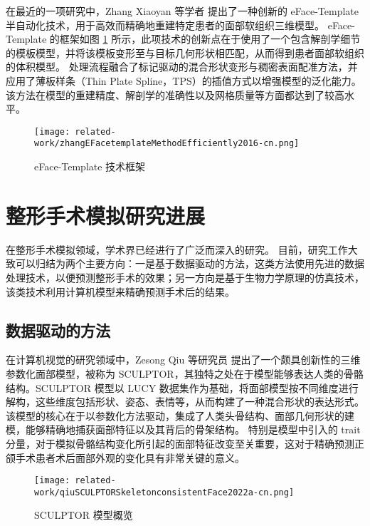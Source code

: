 在最近的一项研究中，Zhang Xiaoyan 等学者 \cite{zhangEFacetemplateMethodEfficiently2016} 提出了一种创新的 eFace-Template 半自动化技术，用于高效而精确地重建特定患者的面部软组织三维模型。
eFace-Template 的框架如图 \ref{fig:zhangEFacetemplateMethodEfficiently2016} 所示，此项技术的创新点在于使用了一个包含解剖学细节的模板模型，并将该模板变形至与目标几何形状相匹配，从而得到患者面部软组织的体积模型。
处理流程融合了标记驱动的混合形状变形与稠密表面配准方法，并应用了薄板样条（Thin Plate Spline，TPS）的插值方式以增强模型的泛化能力。
该方法在模型的重建精度、解剖学的准确性以及网格质量等方面都达到了较高水平。

\begin{figure}
  \centering
  \texttt{[image: related-work/zhangEFacetemplateMethodEfficiently2016-cn.png]}
  \caption{eFace-Template 技术框架 \cite{zhangEFacetemplateMethodEfficiently2016}}
  \label{fig:zhangEFacetemplateMethodEfficiently2016}
\end{figure}

\section{整形手术模拟研究进展}

在整形手术模拟领域，学术界已经进行了广泛而深入的研究。
目前，研究工作大致可以归结为两个主要方向：一是基于数据驱动的方法，这类方法使用先进的数据处理技术，以便预测整形手术的效果；另一方向是基于生物力学原理的仿真技术，该类技术利用计算机模型来精确预测手术后的结果。

\subsection{数据驱动的方法}

在计算机视觉的研究领域中，Zesong Qiu 等研究员 \cite{qiuSCULPTORSkeletonconsistentFace2022a} 提出了一个颇具创新性的三维参数化面部模型，被称为 SCULPTOR，其独特之处在于模型能够表达人类的骨骼结构。SCULPTOR 模型以 LUCY 数据集作为基础，将面部模型按不同维度进行解构，这些维度包括形状、姿态、表情等，从而构建了一种混合形状的表达形式。
该模型的核心在于以参数化方法驱动，集成了人类头骨结构、面部几何形状的建模，能够精确地捕获面部特征以及其背后的骨架结构。
特别是模型中引入的 trait 分量，对于模拟骨骼结构变化所引起的面部特征改变至关重要，这对于精确预测正颌手术患者术后面部外观的变化具有非常关键的意义。

\begin{figure}
  \centering
  \texttt{[image: related-work/qiuSCULPTORSkeletonconsistentFace2022a-cn.png]}
  \caption{SCULPTOR 模型概览 \cite{qiuSCULPTORSkeletonconsistentFace2022a}}
  \label{fig:qiuSCULPTORSkeletonconsistentFace2022a}
\end{figure}

